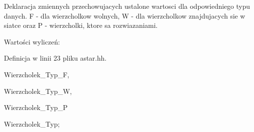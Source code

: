 \-Deklaracja zmiennych przechowujacych ustalone wartosci dla odpowiedniego typu danych. \-F -\/ dla wierzcholkow wolnych, \-W -\/ dla wierzcholkow znajdujacych sie w siatce oraz \-P -\/ wierzcholki, ktore sa rozwiazaniami. 

\begin{Desc}
\item[\-Wartości wyliczeń\-: ]\par
\begin{description}
\item[{\em 
\hypertarget{astar_8hh_af54d448689b4613c3715929ca2a914a2a5021d874406808a1d631fdfed6b05e5e}{\-Wierzcholek\-\_\-\-Typ\-\_\-\-F}\label{astar_8hh_af54d448689b4613c3715929ca2a914a2a5021d874406808a1d631fdfed6b05e5e}
}]\item[{\em 
\hypertarget{astar_8hh_af54d448689b4613c3715929ca2a914a2a2912fc7f312fe8def0f224eac198f59e}{\-Wierzcholek\-\_\-\-Typ\-\_\-\-W}\label{astar_8hh_af54d448689b4613c3715929ca2a914a2a2912fc7f312fe8def0f224eac198f59e}
}]\item[{\em 
\hypertarget{astar_8hh_af54d448689b4613c3715929ca2a914a2a8dcf1159c22e0950df6e214e2a39ac88}{\-Wierzcholek\-\_\-\-Typ\-\_\-\-P}\label{astar_8hh_af54d448689b4613c3715929ca2a914a2a8dcf1159c22e0950df6e214e2a39ac88}
}]\end{description}
\end{Desc}



\-Definicja w linii 23 pliku astar.\-hh.


\begin{DoxyCode}
{
        Wierzcholek_Typ_F, 
        
        Wierzcholek_Typ_W, 
        
        Wierzcholek_Typ_P

}Wierzcholek_Typ;
\end{DoxyCode}
